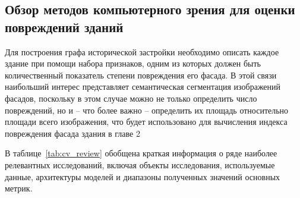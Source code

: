 \documentclass[14pt]{extarticle}
\begin{document}
\subsection{Обзор методов компьютерного зрения для оценки \newline повреждений
            зданий}
\label{subsec:cv_review}

Для построения графа исторической застройки необходимо описать каждое здание
при помощи набора признаков, одним из которых должен быть количественный
показатель степени повреждения его фасада. В этой связи наибольший интерес
представляет семантическая сегментация изображений фасадов, поскольку
в этом случае можно не только определить число повреждений, но и --
что более важно -- определить их площадь относительно площади всего
изображения, что будет использовано для вычисления индекса повреждения фасада здания в главе 2

В таблице~\ref{tab:cv_review} обобщена краткая информация о ряде наиболее
релевантных исследований, включая объекты исследования, используемые данные,
архитектуры моделей и диапазоны полученных значений основных метрик.

\end{document}
